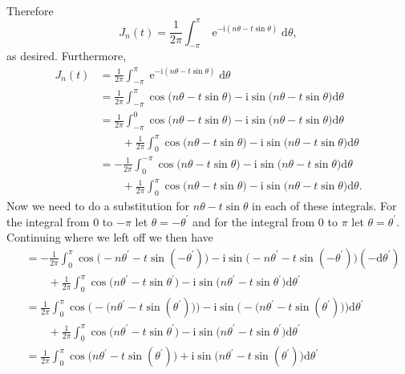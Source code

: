 \documentclass[10pt]{amsart}
\newcommand{\D}{\mathrm{d}}
\newcommand{\I}{\mathrm{i}}
\DeclareMathOperator{\E}{e}
\theoremstyle{nonumberplain}
\begin{document}
\begin{enumerate}[label={\bf {\arabic*}:}]
\begin{align*}
\end{align*}
Therefore
$$
J_n(t) = \frac 1 {2 \pi }\int_{-\pi}^{\pi} \E^{-\I(n\theta - t \sin \theta)} \D \theta,
$$
as desired.
Furthermore,
\begin{align*}
J_n(t) &= \frac 1 {2 \pi }\int_{-\pi}^{\pi} \E^{-\I(n\theta - t \sin \theta)} \D \theta \\
	&= \frac 1 {2 \pi }\int_{-\pi}^{\pi} \cos \big(n\theta - t \sin \theta\big) - \I\sin\big( n\theta - t \sin \theta\big) \D \theta \\
	&= \frac 1 {2 \pi }\int_{-\pi}^{0} \cos \big(n\theta - t \sin \theta\big) - \I\sin\big( n\theta - t \sin \theta\big) \D \theta \\
	& \quad\quad + \frac 1 {2 \pi }\int_{0}^{\pi} \cos \big(n\theta - t \sin \theta\big) - \I\sin\big( n\theta - t \sin \theta\big) \D \theta \\
	&= -\frac 1 {2 \pi }\int_{0}^{-\pi} \cos \big(n\theta - t \sin \theta\big) - \I\sin\big( n\theta - t \sin \theta\big) \D \theta \\
	& \quad\quad + \frac 1 {2 \pi }\int_{0}^{\pi} \cos \big(n\theta - t \sin \theta\big) - \I\sin\big( n\theta - t \sin \theta\big) \D \theta.
\end{align*}
Now we need to do a substitution for $n\theta - t \sin \theta$ in each of these integrals.
For the integral from $0$ to $-\pi$ let $\theta = -\theta^\prime$ and for the integral from $0$ to $\pi$ let $\theta = \theta^\prime$.
Continuing where we left off we then have
\begin{align*}
	&= -\frac 1 {2 \pi }\int_{0}^{\pi} \cos \big(-n\theta^\prime - t \sin (-\theta^\prime)\big) - \I\sin\big(-n\theta^\prime - t \sin (-\theta^\prime)\big) (-\D \theta^\prime) \\
	&\quad\quad+ \frac 1 {2 \pi }\int_{0}^{\pi} \cos \big(n\theta^\prime - t \sin \theta^\prime\big) - \I\sin\big( n\theta^\prime - t \sin \theta^\prime\big) \D \theta^\prime \\
	&= \frac 1 {2 \pi }\int_{0}^{\pi} \cos \bigg(-\big(n\theta^\prime - t \sin (\theta^\prime)\big)\bigg) - \I\sin \bigg(-\big(n\theta^\prime - t \sin (\theta^\prime)\big)\bigg) \D \theta^\prime \\
	&\quad\quad+ \frac 1 {2 \pi }\int_{0}^{\pi} \cos \big(n\theta^\prime - t \sin \theta^\prime\big) - \I\sin\big( n\theta^\prime - t \sin \theta^\prime\big) \D \theta^\prime \\
	&= \frac 1 {2 \pi }\int_{0}^{\pi} \cos \big(n\theta^\prime - t \sin (\theta^\prime)\big) + \I\sin \big(n\theta^\prime - t \sin (\theta^\prime)\big) \D \theta^\prime 

\end{align*}
\end{enumerate}
\end{document}

